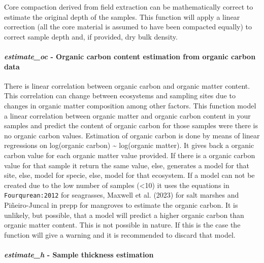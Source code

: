 \documentclass[10pt,a4paper,onecolumn]{article}
\let\oldparagraph\paragraph
\renewcommand{\paragraph}[1]{\oldparagraph{#1}\mbox{}}
\begin{document}
Core compaction derived from field extraction can be mathematically
correct to estimate the original depth of the samples. This function
will apply a linear correction (all the core material is assumed to have
been compacted equally) to correct sample depth and, if provided, dry
bulk density.

\hypertarget{estimate_oc---organic-carbon-content-estimation-from-organic-carbon-data}{%
\paragraph{\texorpdfstring{\textbf{\emph{estimate\_oc}} \textbf{-
Organic carbon content estimation from organic carbon
data}}{estimate\_oc - Organic carbon content estimation from organic carbon data}}\label{estimate_oc---organic-carbon-content-estimation-from-organic-carbon-data}}

There is linear correlation between organic carbon and organic matter
content. This correlation can change between ecosystems and sampling
sites due to changes in organic matter composition among other factors.
This function model a linear correlation between organic matter and
organic carbon content in your samples and predict the content of
organic carbon for those samples were there is no organic carbon values.
Estimation of organic carbon is done by means of linear regressions on
log(organic carbon) \textasciitilde{} log(organic matter). It gives back
a organic carbon value for each organic matter value provided. If there
is a organic carbon value for that sample it return the same value,
else, generates a model for that site, else, model for specie, else,
model for that ecosystem. If a model can not be created due to the low
number of samples (\textless10) it uses the equations in
\texttt{Fourqurean:2012} for seagrasses, Maxwell et al. (2023) for salt
marshes and Piñeiro-Juncal in prepp for mangroves to estimate the
organic carbon. It is unlikely, but possible, that a model will predict
a higher organic carbon than organic matter content. This is not
possible in nature. If this is the case the function will give a warning
and it is recommended to discard that model.

\hypertarget{estimate_h---sample-thickness-estimation}{%
\paragraph{\texorpdfstring{\textbf{\emph{estimate\_h}} \textbf{- Sample
thickness
estimation}}{estimate\_h - Sample thickness estimation}}\label{estimate_h---sample-thickness-estimation}}
\end{document}
